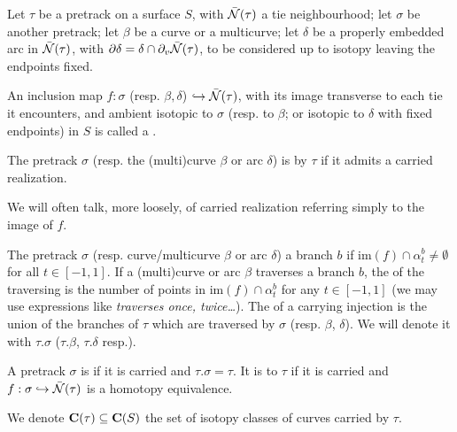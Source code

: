 \begin{defin}\label{def:carried}
Let $\tau$ be a pretrack on a surface $S$, with $\bar{{\mathcal N}}(\tau)$ a tie neighbourhood; let $\sigma$ be another pretrack; let $\beta$ be a curve or a multicurve; let $\delta$ be a properly embedded arc in $\bar{{\mathcal N}}(\tau)$, with $\partial\delta=\delta\cap \partial_v\bar{{\mathcal N}}(\tau)$, to be considered up to isotopy leaving the endpoints fixed.

An inclusion map $f:\sigma$ (resp. $\beta,\delta$) $\hookrightarrow\bar{{\mathcal N}}(\tau)$, with its image transverse to each tie it encounters, and ambient isotopic to $\sigma$ (resp. to $\beta$; or isotopic to $\delta$ with fixed endpoints) in $S$ is called a .

The pretrack $\sigma$ (resp. the (multi)curve $\beta$ or arc $\delta$) is  by $\tau$ if it admits a carried realization. 

We will often talk, more loosely, of carried realization referring simply to the image of $f$.

The pretrack $\sigma$ (resp. curve/multicurve $\beta$ or arc $\delta$)  a branch $b$ if $\mathrm{im}(f)\cap \alpha_t^b\not=\emptyset$ for all $t\in[-1,1]$. If a (multi)curve or arc $\beta$ traverses a branch $b$, the  of the traversing is the number of points in $\mathrm{im}(f)\cap \alpha_t^b$ for any $t\in[-1,1]$ (we may use expressions like \emph{traverses once, twice\ldots}). The  of a carrying injection is the union of the branches of $\tau$ which are traversed by $\sigma$ (resp. $\beta$, $\delta$). We will denote it with $\tau.\sigma$ ($\tau.\beta$, $\tau.\delta$ resp.).

A pretrack $\sigma$ is  if it is carried and $\tau.\sigma=\tau$. It is  to $\tau$ if it is carried and $f:\sigma\hookrightarrow \bar{{\mathcal N}}(\tau)$ is a homotopy equivalence.

We denote $\mathbf C(\tau)\subseteq\mathbf C(S)$ the set of isotopy classes of curves carried by $\tau$.
\end{defin}

